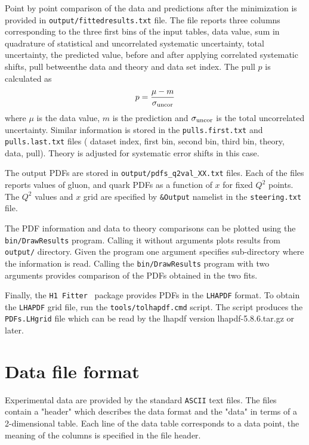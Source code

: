\documentclass[11pt,a4paper]{article}
\newcommand\fitter{ \mbox{\tt H1 Fitter} }
\begin{document}
  Point by point comparison of the data and predictions after the minimization 
  is provided in {\tt output/fittedresults.txt} file. The file reports three columns
  corresponding to the three first bins of the input tables, data value, sum in 
  quadrature of statistical and uncorrelated systematic uncertainty, total
  uncertainty, the predicted value, before and after applying correlated systematic shifts,
  pull betweenthe  data and theory and 
  data set index. The pull $p$ is calculated as 
  \begin{equation}
      p = \frac{ \mu - m} {\sigma_{\rm uncor}}
  \end{equation}
  where $\mu$ is the data value, $m$ is the prediction and $\sigma_{\rm uncor}$ is the total
  uncorrelated uncertainty.
  Similar information is stored in the {\tt pulls.first.txt} and {\tt pulls.last.txt} files
  ( dataset index, first bin, second bin, third bin, theory, data, pull).
  Theory is  adjusted for systematic error shifts in this case.

  The output PDFs are stored in  {\tt output/pdfs\_q2val\_XX.txt} files.
  Each of the files reports values of gluon, and quark PDFs as a function of $x$
  for fixed $Q^2$ points. The $Q^2$ values and $x$ grid are specified by 
  {\tt \&Output} namelist in the {\tt steering.txt} file.
  
  The PDF information and data to theory comparisons can be plotted using 
  the {\tt bin/DrawResults} program.  Calling it without arguments plots results from
  {\tt output/} directory. Given the program one argument specifies sub-directory 
  where the information is read. Calling the {\tt bin/DrawResults} program with two
  arguments provides comparison of the PDFs obtained in the two fits.
  
  Finally, the \fitter\ package provides PDFs in the {\tt LHAPDF} format. To obtain the
  {\tt LHAPDF} grid file, run the {\tt tools/tolhapdf.cmd} script. The script produces 
  the {\tt PDFs.LHgrid} file which can be read by the lhapdf version lhapdf-5.8.6.tar.gz
  or later.



\appendix
\section{Data file format}
\label{sec:dataformat}
   Experimental data are provided by the standard {\tt ASCII} text files. The files
   contain a "header" which describes the data format and the "data" in terms
   of a 2-dimensional table. Each line of the data table corresponds to a
   data point, the meaning of the columns is specified in the file header.
\end{document}
